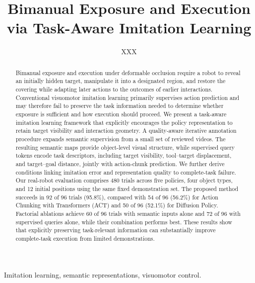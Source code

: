 \documentclass[journal,10pt]{IEEEtran}
\title{Bimanual Exposure and Execution via Task-Aware Imitation Learning}
\author{XXX}
\begin{document}
\maketitle
\begin{abstract}
Bimanual exposure and execution under deformable occlusion require a robot to reveal an initially hidden target, manipulate it into a designated region, and restore the covering while adapting later actions to the outcomes of earlier interactions. Conventional visuomotor imitation learning primarily supervises action prediction and may therefore fail to preserve the task information needed to determine whether exposure is sufficient and how execution should proceed. We present a task-aware imitation learning framework that explicitly encourages the policy representation to retain target visibility and interaction geometry. A quality-aware iterative annotation procedure expands semantic supervision from a small set of reviewed videos. The resulting semantic maps provide object-level visual structure, while supervised query tokens encode task descriptors, including target visibility, tool--target displacement, and target--goal distance, jointly with action-chunk prediction. We further derive conditions linking imitation error and representation quality to complete-task failure. Our real-robot evaluation comprises 480 trials across five policies, four object types, and 12 initial positions using the same fixed demonstration set. The proposed method succeeds in 92 of 96 trials (95.8\%), compared with 54 of 96 (56.2\%) for Action Chunking with Transformers (ACT) and 50 of 96 (52.1\%) for Diffusion Policy. Factorial ablations achieve 60 of 96 trials with semantic inputs alone and 72 of 96 with supervised queries alone, while their combination performs best. These results show that explicitly preserving task-relevant information can substantially improve complete-task execution from limited demonstrations.
\end{abstract}
\begin{IEEEkeywords}
Imitation learning, semantic representations, visuomotor control.
\end{IEEEkeywords}






\FloatBarrier
\appendices



\clearpage


\end{document}
